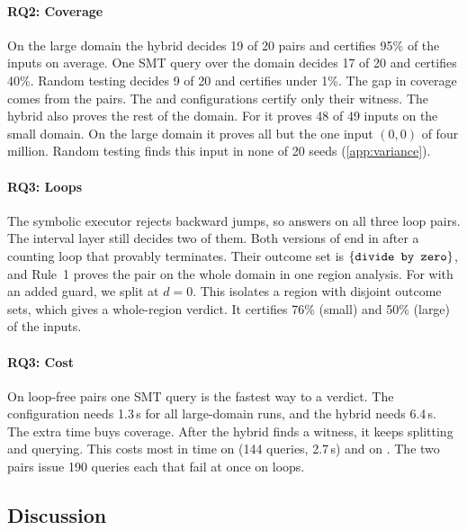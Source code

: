 \paragraph{RQ2: Coverage}
On the large domain the hybrid decides 19 of 20 pairs and certifies 95\% of the inputs on
average. One SMT query over the domain decides 17 of 20 and certifies 40\%. Random testing
decides 9 of 20 and certifies under 1\%. The gap in coverage comes from the \chg{} pairs. The
 and  configurations certify only their witness. The hybrid also
proves the rest of the domain. For  it proves 48 of 49 inputs \pres{} on the small
domain. On the large domain it proves all but the one input $(0,0)$ of four million. Random
testing finds this input in none of 20 seeds (\cref{app:variance}).

\paragraph{RQ3: Loops}
The symbolic executor rejects backward jumps, so  answers \unk{} on all three
loop pairs. The interval layer still decides two of them. Both versions of
 end in  after a counting loop that provably terminates. Their
outcome set is $\left\{\texttt{divide by zero}\right\}$, and Rule~1 proves the pair \pres{} on the whole domain in one
region analysis. For  with an added guard, we split at $d = 0$. This isolates a
region with disjoint outcome sets, which gives a whole-region \chg{} verdict. It certifies
76\% (small) and 50\% (large) of the inputs.

\paragraph{RQ3: Cost}
On loop-free pairs one SMT query is the fastest way to a verdict. The 
configuration needs 1.3\,s for all large-domain runs, and the hybrid needs 6.4\,s. The extra
time buys coverage. After the hybrid finds a witness, it keeps splitting and querying. This
costs most in time on  (144 queries, 2.7\,s) and on
. The two  pairs issue 190 queries each that fail at once
on loops.

\subsection{Discussion}
\label{sec:discussion}

